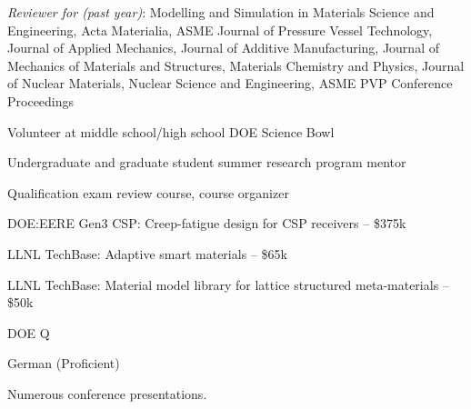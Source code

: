 \documentclass[english]{xetexCV}
\begin{document}
 \emph{Reviewer for (past year)}: 
Modelling and Simulation in Materials Science and Engineering,
Acta Materialia,
ASME Journal of Pressure Vessel Technology,
Journal of Applied Mechanics,
Journal of Additive Manufacturing, 
Journal of Mechanics of Materials and Structures,
Materials Chemistry and Physics,
Journal of Nuclear Materials,
Nuclear Science and Engineering,
ASME PVP Conference Proceedings 


Volunteer at middle school/high school DOE Science Bowl 

Undergraduate and graduate student summer research program mentor 

Qualification exam review course, course organizer 


DOE:EERE Gen3 CSP: Creep-fatigue design for CSP receivers -- \$375k 

LLNL TechBase: Adaptive smart materials -- \$65k 

LLNL TechBase: Material model library for lattice structured meta-materials
-- \$50k 


DOE Q 

German (Proficient) 


\nocite{*}


\printbibliography[keyword=refereed,heading=none]


\printbibliography[keyword=pending,heading=none]


\printbibliography[keyword=conf,heading=none]


\printbibliography[keyword=patents,heading=none]


\printbibliography[keyword=nonref,heading=none]


\printbibliography[keyword=invited,heading=none]

Numerous conference presentations.
\end{document}
